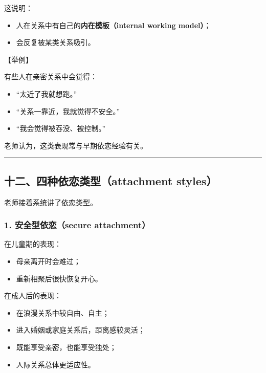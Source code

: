\documentclass[
  chinese,
  9pt,
  a4paper,
]{ctexart}
\providecommand{\tightlist}{%
  \setlength{\itemsep}{0pt}\setlength{\parskip}{0pt}}
\begin{document}
这说明：

\begin{itemize}
\tightlist
\item
  人在关系中有自己的\textbf{内在模板（internal working model）}；
\item
  会反复被某类关系吸引。
\end{itemize}

【举例】

有些人在亲密关系中会觉得：

\begin{itemize}
\tightlist
\item
  ``太近了我就想跑。''
\item
  ``关系一靠近，我就觉得不安全。''
\item
  ``我会觉得被吞没、被控制。''
\end{itemize}

老师认为，这类表现常与早期依恋经验有关。

\begin{center}\rule{0.5\linewidth}{0.5pt}\end{center}

\subsection{十二、四种依恋类型（attachment
styles）}\label{ux5341ux4e8cux56dbux79cdux4f9dux604bux7c7bux578battachment-styles}

老师接着系统讲了依恋类型。

\subsubsection{1. 安全型依恋（secure
attachment）}\label{ux5b89ux5168ux578bux4f9dux604bsecure-attachment}

在儿童期的表现：

\begin{itemize}
\tightlist
\item
  母亲离开时会难过；
\item
  重新相聚后很快恢复开心。
\end{itemize}

在成人后的表现：

\begin{itemize}
\tightlist
\item
  在浪漫关系中较自由、自主；
\item
  进入婚姻或家庭关系后，距离感较灵活；
\item
  既能享受亲密，也能享受独处；
\item
  人际关系总体更适应性。
\end{itemize}
\end{document}
